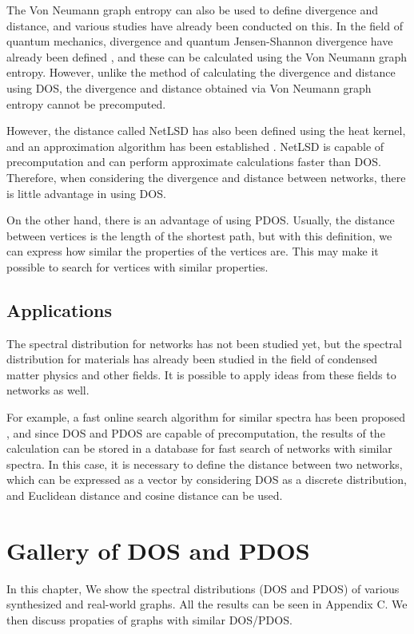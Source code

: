 \documentclass[senior,final,11pt]{iscs-thesis}
\begin{document}
The Von Neumann graph entropy can also be used to define divergence and distance, and various studies have already been conducted on this. In the field of quantum mechanics, divergence and quantum Jensen-Shannon divergence have already been defined \cite{briet2009properties, lamberti2008metric}, and these can be calculated using the Von Neumann graph entropy. However, unlike the method of calculating the divergence and distance using DOS, the divergence and distance obtained via Von Neumann graph entropy cannot be precomputed.

However, the distance called NetLSD has also been defined using the heat kernel, and an approximation algorithm has been established \cite{tsitsulin2018netlsd,tsitsulin2020just}. NetLSD is capable of precomputation and can perform approximate calculations faster than DOS. Therefore, when considering the divergence and distance between networks, there is little advantage in using DOS.

On the other hand, there is an advantage of using PDOS. Usually, the distance between vertices is the length of the shortest path, but with this definition, we can express how similar the properties of the vertices are. This may make it possible to search for vertices with similar properties.

\section{Applications}
The spectral distribution for networks has not been studied yet, but the spectral distribution for materials has already been studied in the field of condensed matter physics and other fields. It is possible to apply ideas from these fields to networks as well.

For example, a fast online search algorithm for similar spectra has been proposed \cite{borysov2018online,geilhufe2018towards}, and since DOS and PDOS are capable of precomputation, the results of the calculation can be stored in a database for fast search of networks with similar spectra. In this case, it is necessary to define the distance between two networks, which can be expressed as a vector by considering DOS as a discrete distribution, and Euclidean distance and cosine distance can be used.



\chapter{Gallery of DOS and PDOS}
In this chapter, We show the spectral distributions (DOS and PDOS) of various synthesized and real-world graphs. All the results can be seen in Appendix C. We then discuss propaties of graphs with similar DOS/PDOS.
\end{document}
